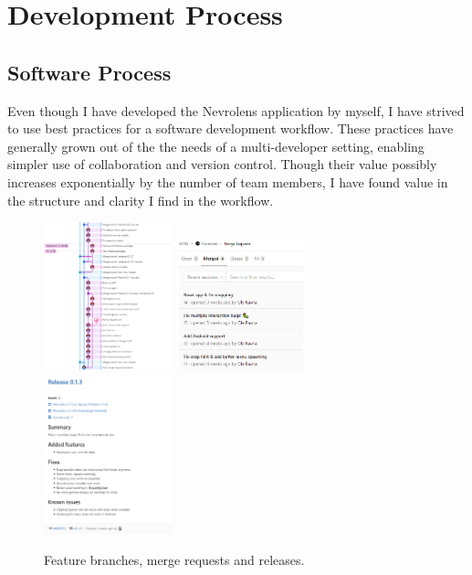 \chapter{Development Process}


\section{Software Process}


Even though I have developed the Nevrolens application by myself, I have strived to use best practices for a software development workflow. These practices have generally grown out of the the needs of a multi-developer setting, enabling simpler use of collaboration and version control. Though their value possibly increases exponentially by the number of team members, I have found value in the structure and clarity I find in the workflow. 

\begin{figure}[h]
    \includegraphics[width=0.33\textwidth]{fig/gitkraken_gitlog}
    \includegraphics[width=0.33\textwidth]{fig/mergerequests}
    \includegraphics[width=0.33\textwidth]{fig/release_gitlab}
    \caption{Feature branches, merge requests and releases.}
\end{figure}

